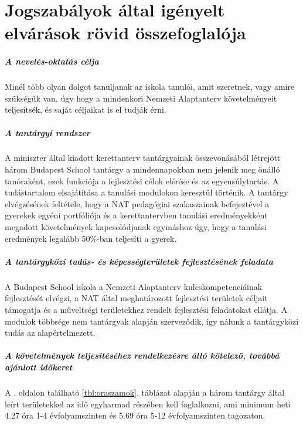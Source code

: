 \chapter{Jogszabályok által igényelt elvárások rövid összefoglalója}
\paragraph{A nevelés-oktatás célja}

Minél több olyan dolgot tanuljanak az iskola tanulói, amit szeretnek, vagy
amire szükségük van, úgy hogy a mindenkori Nemzeti Alaptanterv követelményeit
teljesítsék, és saját céljaikat is el tudják érni.

\paragraph{A tantárgyi rendszer}

A miniszter által kiadott kerettanterv tantárgyainak összevonásából létrejött
három Budapest School tantárgy a mindennapokban nem jelenik meg önálló
tanóraként, ezek funkciója a fejlesztési célok elérése és az egyensúlytartás. A
tudástartalom elsajátítása a tanulási modulokon keresztül történik. A tantárgy
elvégzésének feltétele, hogy a NAT pedagógiai szakaszainak befejeztével a
gyerekek egyéni portfóliója és a kerettantervben tanulási eredményekként megadott követelmények kapcsolódjanak
egymáshoz úgy, hogy a tanulási eredmények legalább 50\%-ban teljesíti a gyerek.

\paragraph{A tantárgyközi tudás- és képességterületek fejlesztésének feladata}

A Budapest School iskola a Nemzeti Alaptanterv kulcskompetenciáinak
fejlesztését elvégzi, a NAT által meghatározott fejlesztési területek céljait
támogatja és a műveltségi területekhez rendelt fejlesztési feladatokat ellátja.
A modulok többsége nem tantárgyak alapján szerveződik, így nálunk a
tantárgyközi tudás az alapértelmezett.

\paragraph{A követelmények teljesítéséhez rendelkezésre álló kötelező, továbbá
    ajánlott időkeret}

A \pageref{tbl:oraszamok}. oldalon található \ref{tbl:oraszamok}. táblázat
alapján a három tantárgy által leírt területekkel az idő egyharmad részében
kell foglalkozni, ami minimum heti 4.27 óra 1-4 évfolyamszinten és 5.69 óra 5-12 évfolyamszinten
tagozaton.

